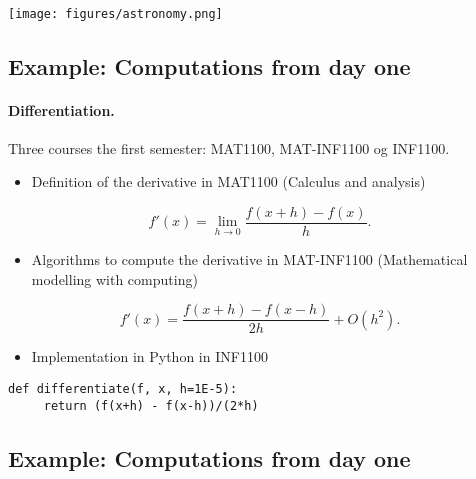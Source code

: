 \documentclass[%
twoside,                 %
final,                   %
10pt]{article}
\begin{document}
\paragraph{}


\centerline{\texttt{[image: figures/astronomy.png]}}




\subsection*{Example: Computations from day one}

\paragraph{Differentiation.}
Three courses the first semester:  MAT1100, MAT-INF1100 og INF1100.
\begin{itemize}
\item Definition  of the derivative in  MAT1100 (Calculus and analysis) 
\end{itemize}

\noindent
\[
 f'(x)=\lim_{h \rightarrow 0}\frac{f(x+h)-f(x)}{h}.
\]
\begin{itemize}
\item Algorithms to compute the derivative in MAT-INF1100  (Mathematical modelling with computing)
\end{itemize}

\noindent
\[
 f'(x)= \frac{f(x+h)-f(x-h)}{2h}+O(h^2).
\]
\begin{itemize}
\item Implementation in Python in INF1100
\end{itemize}

\noindent
\begin{verbatim}
def differentiate(f, x, h=1E-5):
     return (f(x+h) - f(x-h))/(2*h)
\end{verbatim}



\subsection*{Example: Computations from day one}

\end{document}
